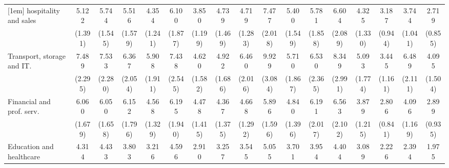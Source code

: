 {\begin{tabular}{l*{16}{c}}
[1em]
hospitality and sales&       5.122\sym{***}&       5.744\sym{***}&       5.516\sym{***}&       4.354\sym{***}&       6.100\sym{***}&       3.850\sym{***}&       4.739\sym{***}&       4.719\sym{***}&       7.477\sym{***}&       5.400\sym{***}&       5.781\sym{***}&       6.604\sym{***}&       4.325\sym{***}&       3.187\sym{***}&       3.744\sym{***}&       2.719\sym{**} \\
                    &     (1.391)         &     (1.545)         &     (1.579)         &     (1.241)         &     (1.877)         &     (1.199)         &     (1.469)         &     (1.283)         &     (2.018)         &     (1.549)         &     (1.858)         &     (2.089)         &     (1.330)         &     (0.944)         &     (1.041)         &     (0.855)         \\
[1em]
Transport, storage and IT.&       7.489\sym{***}&       7.533\sym{***}&       6.367\sym{***}&       5.908\sym{***}&       7.438\sym{***}&       4.620\sym{***}&       4.922\sym{***}&       6.460\sym{***}&       9.929\sym{***}&       5.710\sym{***}&       6.530\sym{***}&       8.349\sym{***}&       5.093\sym{***}&       3.445\sym{***}&       6.489\sym{***}&       4.095\sym{***}\\
                    &     (2.295)         &     (2.280)         &     (2.054)         &     (1.911)         &     (2.545)         &     (1.582)         &     (1.686)         &     (2.016)         &     (3.084)         &     (1.867)         &     (2.365)         &     (2.991)         &     (1.774)         &     (1.161)         &     (2.111)         &     (1.504)         \\
[1em]
Financial and prof. serv.&       6.060\sym{***}&       6.050\sym{***}&       6.152\sym{***}&       4.568\sym{***}&       6.195\sym{***}&       4.478\sym{***}&       4.367\sym{***}&       4.668\sym{***}&       5.896\sym{***}&       4.840\sym{***}&       6.191\sym{***}&       6.563\sym{***}&       3.879\sym{***}&       2.806\sym{***}&       4.096\sym{***}&       2.899\sym{***}\\
                    &     (1.679)         &     (1.658)         &     (1.796)         &     (1.329)         &     (1.940)         &     (1.415)         &     (1.375)         &     (1.292)         &     (1.596)         &     (1.396)         &     (2.017)         &     (2.102)         &     (1.215)         &     (0.841)         &     (1.169)         &     (0.935)         \\
[1em]
Education and healthcare&       4.314\sym{***}&       4.433\sym{***}&       3.803\sym{***}&       3.216\sym{***}&       4.596\sym{***}&       2.910\sym{***}&       3.257\sym{***}&       3.545\sym{***}&       5.055\sym{***}&       3.701\sym{***}&       3.954\sym{***}&       4.404\sym{***}&       3.089\sym{***}&       2.226\sym{**} &       2.394\sym{**} &       1.975\sym{*}  \\

\end{tabular}}
